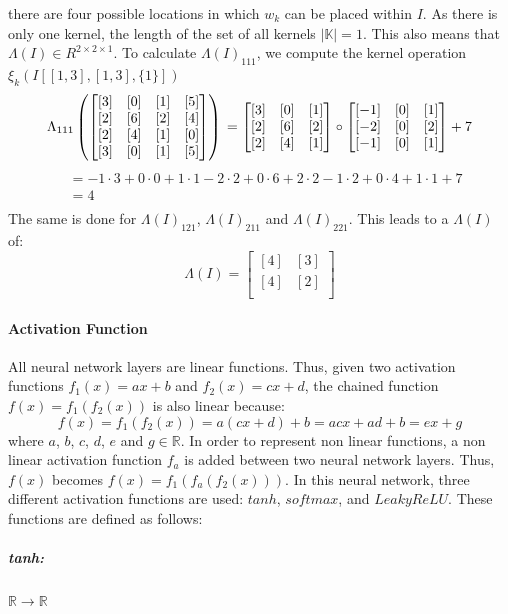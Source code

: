 \documentclass[12pt]{article}
\begin{document}
there are four possible locations in which \(w_k\) can be placed within \(I\). As there is only one kernel, the length of the set of all kernels \(|\mathbb{K}| = 1\). This also means that \(\Lambda(I) \in R^{2 \times 2 \times 1}\). To calculate \(\Lambda(I)_{111}\), we compute the kernel operation \(\xi_k(I[[1,3],[1,3],\{1\}])\)
\begin{equation}
\label{eq:conv:eg}
\Lambda_{111}
\left(\begin{bmatrix}
[3] & [0] & [1] & [5] \\
[2] & [6] & [2] & [4] \\
[2] & [4] & [1] & [0] \\
[3] & [0] & [1] & [5] \\
\end{bmatrix}\right)\\
 = \begin{bmatrix}
[3] & [0] & [1] \\
[2] & [6] & [2] \\
[2] & [4] & [1] \\
\end{bmatrix} \circ 
\begin{bmatrix}
[-1] & [0] & [1] \\
[-2] & [0] & [2] \\
[-1] & [0] & [1]
\end{bmatrix} + 7
\end{equation}
\begin{align*}
&= -1 \cdot 3 + 0 \cdot 0 + 1 \cdot 1 - 2 \cdot 2 + 0 \cdot 6 + 2 \cdot 2 -1 \cdot 2 + 0 \cdot 4 + 1 \cdot 1 + 7\\
&= 4\\
\end{align*}
The same is done for \(\Lambda(I)_{121}\), \(\Lambda(I)_{211}\) and \(\Lambda(I)_{221}\). This leads to a \(\Lambda(I)\) of:
\[
\Lambda(I) = \begin{bmatrix}
[4] & [3] \\
[4] & [2] \\
\end{bmatrix}
\]
\paragraph{Activation Function}
All neural network layers are linear functions. Thus, given two activation functions \(f_1(x) = ax + b\) and \(f_2(x) = cx + d\), the chained function \(f(x) = f_1(f_2(x))\) is also linear because:
\begin{equation}
\label{eq:proofOfLinearity}
f(x) = f_1(f_2(x)) = a(cx + d) + b = acx + ad + b = ex + g
\end{equation}
where \(a\),  \(b\), \(c\), \(d\), \(e\) and \(g \in \mathbb R\). In order to represent non linear functions, a non linear activation function \(f_a\) is added between two neural network layers. Thus, \(f(x)\) becomes \(f(x) = f_1(f_a(f_2(x)))\). In this neural network, three different activation functions are used: \(tanh\), \(softmax\), and \(LeakyReLU\). These functions are defined as follows:
\subparagraph*{tanh:}\(\mathbb{R}\to \mathbb{R}\)
\end{document}
